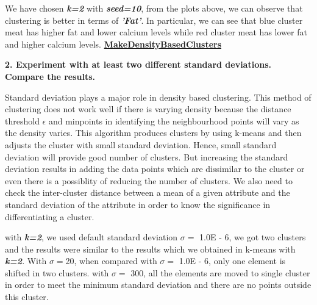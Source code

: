 \documentclass[a4paper,10pt]{article}
\begin{document}
We have chosen \textbf{\textit{k=2}} with \textbf{\textit{seed=10}}, from the plots above, we can observe that clustering is 
better in terms of \textbf{\textit{'Fat'}}. In particular, we can see that blue cluster meat has higher fat and lower calcium levels while red 
cluster meat has lower fat and higher calcium levels.
\newpage
\textbf{\large\underline{MakeDensityBasedClusters}} \par
\textbf{2. Experiment with at least two different standard deviations. Compare the results.} \par
Standard deviation plays a major role in density based clustering. This method of clustering does not work well if 
there is varying density because the distance threshold $\epsilon$ and minpoints in identifying the neighbourhood points 
will vary as the density varies. This algorithm produces clusters by using k-means and then adjusts the cluster with
small standard deviation. Hence, small standard deviation will provide good number of clusters. But increasing the standard 
deviation results in adding the data points which are dissimilar to the cluster or even there is a possiblity of reducing the 
number of clusters.
We also need to check the inter-cluster distance between a mean of a given attribute and the standard deviation of the 
attribute in order to know the significance in differentiating a cluster. \par
with \textbf{\textit{k=2}}, we used default standard deviation $\sigma=$ 1.0E - 6, we got two clusters and the results were
similar to the results which we obtained in k-means with \textbf{\textit{k=2}}. With $\sigma=$20, when compared with 
$\sigma=$ 1.0E - 6, only one element is shifted in two clusters. with $\sigma=$ 300, all the elements are moved to single 
cluster in order to meet the minimum standard deviation and there are no points outside this cluster.
\end{document}
